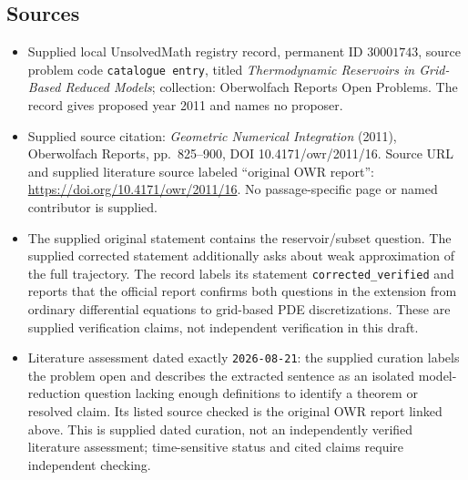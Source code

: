 \documentclass[11pt]{article}
\begin{document}
\subsection{Sources}
\begin{itemize}
\item Supplied local UnsolvedMath registry record, permanent ID \(30001743\), source problem code \texttt{catalogue entry}, titled \emph{Thermodynamic Reservoirs in Grid-Based Reduced Models}; collection: Oberwolfach Reports Open Problems. The record gives proposed year 2011 and names no proposer.
\item Supplied source citation: \emph{Geometric Numerical Integration} (2011), Oberwolfach Reports, pp.~825--900, DOI 10.4171/owr/2011/16. Source URL and supplied literature source labeled ``original OWR report'': \url{https://doi.org/10.4171/owr/2011/16}. No passage-specific page or named contributor is supplied.
\item The supplied original statement contains the reservoir/subset question. The supplied corrected statement additionally asks about weak approximation of the full trajectory. The record labels its statement \texttt{corrected\_verified} and reports that the official report confirms both questions in the extension from ordinary differential equations to grid-based PDE discretizations. These are supplied verification claims, not independent verification in this draft.
\item Literature assessment dated exactly \texttt{2026-08-21}: the supplied curation labels the problem open and describes the extracted sentence as an isolated model-reduction question lacking enough definitions to identify a theorem or resolved claim. Its listed source checked is the original OWR report linked above. This is supplied dated curation, not an independently verified literature assessment; time-sensitive status and cited claims require independent checking.
\end{itemize}
\end{document}
